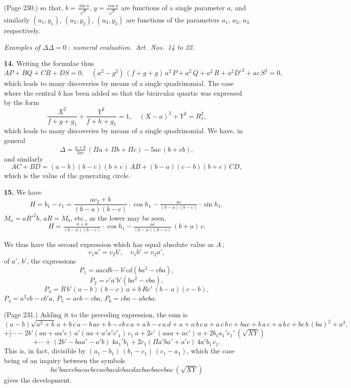 \documentclass[11pt,a4paper]{article}
\theoremstyle{plain}
\theoremstyle{definition}
\begin{document}
\medskip

\noindent (Page 230.) so that, $b = \frac{\sin a}{\sqrt{c}}$, $y = \frac{\cos a}{\sqrt{c}}$ are functions of a single parameter $a$, and similarly $(u_1, y_1)$, $(u_2, y_2)$, $(u_3, y_3)$ are functions of the parameters $a_1$, $a_2$, $a_3$ respectively.

\bigskip

\noindent\textit{Examples of $\Delta\Delta=0$ }: \textit{numeral evaluation.\ Art.\ Nos.\ 14 to 22.}

\medskip

\noindent\textbf{14.} Writing the formulae thus
\[
A P + B Q + C R + D S = 0, \quad (a^2 - g^2)\,(f + g + g)\,a^2\,P + a^2\,Q + a^2\,R + a^2 D'^2 + a c\,S^2 = 0,
\]
which leads to many discoveries by means of a single quadrinomial. The case where the central $b$ has been added so that the bicircular quartic was expressed by the form
\[
\frac{X^2}{f + g + g_1} + \frac{Y^2}{f + h + g_1} = 1, \quad (X - a)^2 + Y^2 = R_1^2,
\]
which leads to many discoveries by means of a single quadrinomial. We have, in general
\[
\Delta = \tfrac{a + b}{2 a c}\,(\Pi a + \Pi b + \Pi c) - 5 a c\,(b + c b),
\]
and similarly
\[
A C + B D = (a - b)(b - c)(b + c)\,A B + (b - a)(c - b)(b + c)\,C D,
\]
which is the value of the generating circle.

\medskip

\noindent\textbf{15.} We have
\[
H = b_1 - c_1 = \frac{a c_2 + b}{(b - a)(b - c)}\cdot \cos h_1 - \tfrac{a c}{(b - a)(b - c)}\cdot \sin h_1,
\]
$M_a = a R'^2 b$, $a R = M_b$, etc., as the lower may be seen,
\[
H = \tfrac{a + a}{(b - a)(b - c)}\cdot \cos h_1 - \tfrac{a c}{(b - a)(b - c)}\,(b + a)\,c.
\]

We thus have the second expression which has equal absolute value as $A$\,;
\[
v_1 a' = v_2 b', \quad v_1 b' = v_2 a',
\]
of $a'$, $b'$, the expressions
\[
P_1 = a a c d b - b' c d (b a^2 - c b a),
\]
\[
P_2 = c' a' b' (b a^2 - c b a),
\]
\[
P_3 = R\,b' (a - b)(b - c)\,a + b\,R c'\,(b - a)(c - b),
\]
$P_4 = a^2 c b - c b' a$,
$P_5 = a c b - c b a$,
$P_6 = c b a - a b c b a$.

\medskip

\noindent (Page 231.) Adding it to the preceding expression, the sum is
\[
( a - b)\sqrt{a^2 + b}\,a + b\,c\,a - b\,a c + b - c b\,c\,a + a\,b - c\,a\,d + a + a\,b\,c\,a + a\,c\,b\,c + b a c + b\,a\,c + a\,b\,c + b c\,b\,(b a)^2 + a^2,
\]
\[
+ ]\cdots - 2 b' (a a + a a' c)\,a' (a a + a' a' c'_1)\,c_1\,a + 2 c'\,(a a a + a c')\,a + 2 b_1 a_1' c_1'\,(\sqrt{X Y})
\]
\[
+ \cdots + (2 b' - b a a' - a' b)\,4 a_1' b_1 + 2 c_1 (\Pi a' b a' + a' c)\,4 a' b_1\,c_1.
\]
This is, in fact, divisible by $(a_1 - b_1)\,(b_1 - c_1)\,(c_1 - a_1)$, which the case being of an inquiry between the symbols
\[
b a' b a c c c b a c a c b c c a c b a c d c b a c d a c b a c b a c c b a c\,(\sqrt{X Y})
\]
gives the development.
\end{document}
